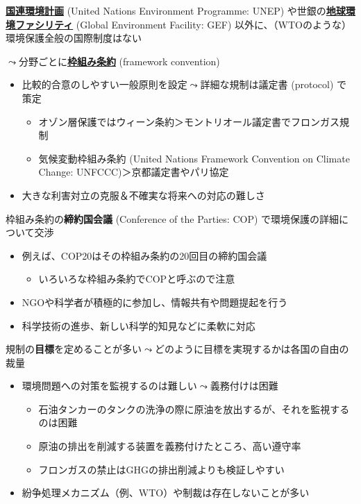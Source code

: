\documentclass[
  xelatex,
  ja=standard]{bxjsarticle}
\providecommand{\tightlist}{%
  \setlength{\itemsep}{0pt}\setlength{\parskip}{0pt}}\usepackage{longtable,booktabs,array}
\begin{document}
\href{https://www.mofa.go.jp/mofaj/gaiko/kankyo/kikan/unep.html}{\textbf{国連環境計画}}
(United Nations Environment Programme: UNEP)
や世銀の\href{https://www.mofa.go.jp/mofaj/gaiko/kankyo/kikan/gbl_env.html}{\textbf{地球環境ファシリティ}}
(Global Environment Facility: GEF)
以外に、（WTOのような）環境保護全般の国際制度はない

\(\leadsto\)分野ごとに\href{https://www.mofa.go.jp/mofaj/files/000135675.pdf}{\textbf{枠組み条約}}
(framework convention)

\begin{itemize}
\tightlist
\item
  比較的合意のしやすい一般原則を設定\(\leadsto\)詳細な規制は議定書
  (protocol) で策定

  \begin{itemize}
  \tightlist
  \item
    オゾン層保護ではウィーン条約＞モントリオール議定書でフロンガス規制
  \item
    気候変動枠組み条約 (United Nations Framework Convention on Climate
    Change: UNFCCC)＞京都議定書やパリ協定
  \end{itemize}
\item
  大きな利害対立の克服＆不確実な将来への対応の難しさ
\end{itemize}

枠組み条約の\textbf{締約国会議} (Conference of the Parties: COP)
で環境保護の詳細について交渉

\begin{itemize}
\tightlist
\item
  例えば、COP20はその枠組み条約の20回目の締約国会議

  \begin{itemize}
  \tightlist
  \item
    いろいろな枠組み条約でCOPと呼ぶので注意
  \end{itemize}
\item
  NGOや科学者が積極的に参加し、情報共有や問題提起を行う
\item
  科学技術の進歩、新しい科学的知見などに柔軟に対応
\end{itemize}

規制の\textbf{目標}を定めることが多い\(\leadsto\)どのように目標を実現するかは各国の自由の裁量

\begin{itemize}
\tightlist
\item
  環境問題への対策を監視するのは難しい\(\leadsto\)義務付けは困難

  \begin{itemize}
  \tightlist
  \item
    石油タンカーのタンクの洗浄の際に原油を放出するが、それを監視するのは困難
  \item
    原油の排出を削減する装置を義務付けたところ、高い遵守率\citep{mitchell1994}
  \item
    フロンガスの禁止はGHGの排出削減よりも検証しやすい
  \end{itemize}
\item
  紛争処理メカニズム（例、WTO）や制裁は存在しないことが多い
\end{itemize}


  
\end{document}
